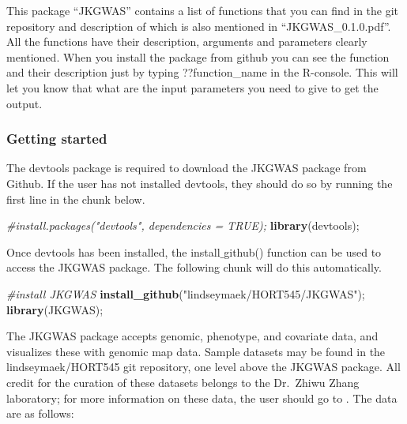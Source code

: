 \documentclass[
]{article}
\newenvironment{Shaded}{\begin{snugshade}}{\end{snugshade}}
\newcommand{\CommentTok}[1]{\textcolor[rgb]{0.56,0.35,0.01}{\textit{#1}}}
\newcommand{\KeywordTok}[1]{\textcolor[rgb]{0.13,0.29,0.53}{\textbf{#1}}}
\newcommand{\NormalTok}[1]{#1}
\newcommand{\StringTok}[1]{\textcolor[rgb]{0.31,0.60,0.02}{#1}}
\begin{document}
This package ``JKGWAS'' contains a list of functions that you can find
in the git repository and description of which is also mentioned in
``JKGWAS\_0.1.0.pdf''. All the functions have their description,
arguments and parameters clearly mentioned. When you install the package
from github you can see the function and their description just by
typing ??function\_name in the R-console. This will let you know that
what are the input parameters you need to give to get the output.

\hypertarget{getting-started}{%
\subsubsection{\texorpdfstring{\textbf{Getting
started}}{Getting started}}\label{getting-started}}

The devtools package is required to download the JKGWAS package from
Github. If the user has not installed devtools, they should do so by
running the first line in the chunk below.

\begin{Shaded}
\begin{Highlighting}[]
\CommentTok{\#install.packages("devtools", dependencies = TRUE);}
\KeywordTok{library}\NormalTok{(devtools);}
\end{Highlighting}
\end{Shaded}

Once devtools has been installed, the install\(\_\)github() function can
be used to access the JKGWAS package. The following chunk will do this
automatically.

\begin{Shaded}
\begin{Highlighting}[]
\CommentTok{\#install JKGWAS}
\KeywordTok{install\_github}\NormalTok{(}\StringTok{"lindseymaek/HORT545/JKGWAS"}\NormalTok{);}
\KeywordTok{library}\NormalTok{(JKGWAS);}
\end{Highlighting}
\end{Shaded}

The JKGWAS package accepts genomic, phenotype, and covariate data, and
visualizes these with genomic map data. Sample datasets may be found in
the lindseymaek/HORT545 git repository, one level above the JKGWAS
package. All credit for the curation of these datasets belongs to the
Dr.~Zhiwu Zhang laboratory; for more information on these data, the user
should go to . The data are as follows:

\par
\end{document}

